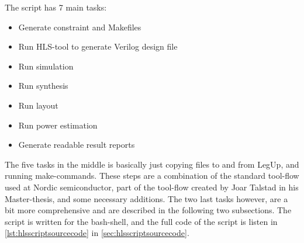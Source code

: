The script has 7 main tasks:
\begin{itemize}
    \item Generate constraint and Makefiles
    \item Run HLS-tool to generate Verilog design file
    \item Run simulation
    \item Run synthesis
    \item Run layout
    \item Run power estimation
    \item Generate readable result reports
\end{itemize}
The five tasks in the middle is basically just copying files to and from LegUp, and running make-commands. These steps are a combination of the standard tool-flow used at Nordic semiconductor, part of the tool-flow created by Joar Talstad in his Master-thesis, and some necessary additions. The two last tasks however, are a bit more comprehensive and are described in the following two subsections. The script is written for the bash-shell, and the full code of the script is listen in \cref{lst:hlsscriptsourcecode} in \cref{sec:hlsscriptsourcecode}.

